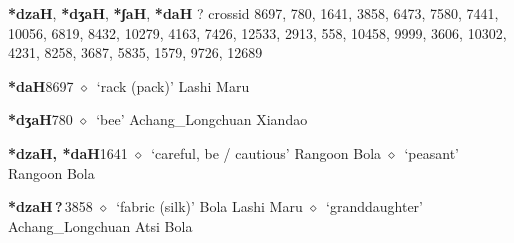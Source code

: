 \item
\textbf{*dzaH}, \textbf{*dʒaH}, \textbf{*ʃaH}, \textbf{*daH}
?
  {\tiny crossid 8697, 780, 1641, 3858, 6473, 7580, 7441, 10056, 6819, 8432, 10279, 4163, 7426, 12533, 2913, 558, 10458, 9999, 3606, 10302, 4231, 8258, 3687, 5835, 1579, 9726, 12689}
  \begin{list}{}{\leftmargin=1.5em \itemindent=-1.5em}
  \item {\footnotesize \textbf{*daH}}{\tiny 8697}
         $\diamond$~`rack (pack)'
         Lashi 
\hspace{1ex}
         Maru 
  \item {\footnotesize \textbf{*dʒaH}}{\tiny 780}
\hspace{1ex}
         $\diamond$~`bee'
         Achang\_Longchuan 
\hspace{1ex}
         Xiandao 
  \item {\footnotesize \textbf{*dzaH, *daH}}{\tiny 1641}
\hspace{1ex}
         $\diamond$~`careful, be / cautious'
         Rangoon 
\hspace{1ex}
         Bola 
\hspace{1ex}
         $\diamond$~`peasant'
         Rangoon 
\hspace{1ex}
         Bola 
  \item {\footnotesize \textbf{*dzaH\,?\,}}{\tiny 3858}
\hspace{1ex}
         $\diamond$~`fabric (silk)'
         Bola 
\hspace{1ex}
         Lashi 
\hspace{1ex}
         Maru 
\hspace{1ex}
         $\diamond$~`granddaughter'
         Achang\_Longchuan 
\hspace{1ex}
         Atsi 
\hspace{1ex}
         Bola 

\end{list}
